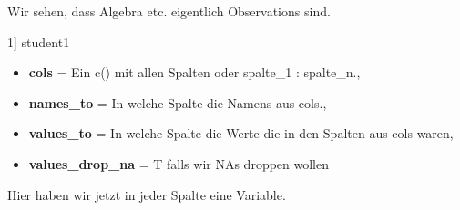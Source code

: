 Wir sehen, dass Algebra etc. eigentlich Observations sind.
\begin{rcode}{1]}
student1 %
\end{rcode}
\begin{itemize}[noitemsep]
  \item \textbf{cols} = Ein c() mit allen Spalten oder spalte\_1 : spalte\_n.,
  \item \textbf{names\_to} = In welche Spalte die Namens aus cols.,
  \item \textbf{values\_to} = In welche Spalte die Werte die in den Spalten aus cols waren,
  \item \textbf{values\_drop\_na} = T falls wir NAs droppen wollen
\end{itemize}
Hier haben wir jetzt in jeder Spalte eine Variable.
\columnbreak
